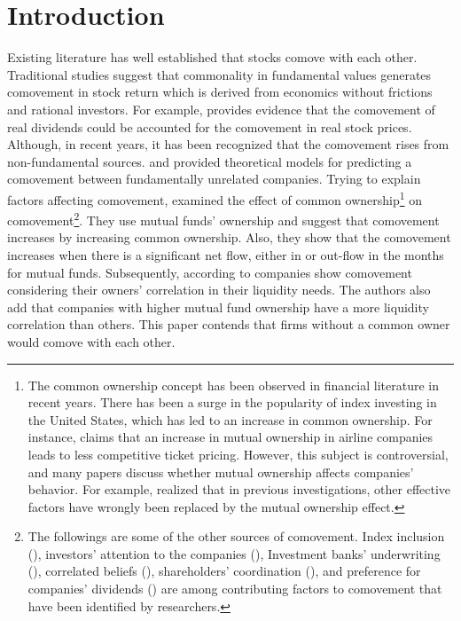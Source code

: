 \section{Introduction}

Existing literature has well established that stocks comove with each other. Traditional studies suggest that commonality in fundamental values generates comovement in stock return which is derived from economics without frictions and rational investors. For example, \cite{shiller1989comovements} provides evidence that the comovement of real dividends could be accounted for the comovement in real stock prices.
	Although, in recent years, it has been recognized that the comovement rises from non-fundamental sources. {\cite{barberis2003style} and \cite{barberis2005comovement}} provided theoretical models for predicting a comovement between fundamentally unrelated companies. Trying to explain factors affecting comovement, {\cite{AntonPolk}} examined the effect of common ownership\footnote{The common ownership concept has been observed in financial literature in recent years. There has been a surge in the popularity of index investing in the United States, which has led to an increase in common ownership. 
			For instance, \cite{azar2018anticompetitive} claims that an increase in mutual ownership in airline companies leads to less competitive ticket pricing. However, this subject is controversial, and many papers discuss whether mutual ownership affects companies' behavior.
			For example, \cite{lewellen2021does} realized that in previous investigations, other effective factors have wrongly been replaced by the mutual ownership effect.
		} on comovement\footnote{	The followings are some of the other sources of comovement. Index inclusion ({\cite{barberis2005comovement}}), investors' attention to the companies ({\cite{wu2014investor}}), Investment banks' underwriting ({\cite{grullon2014comovement}}), correlated beliefs ({\cite{david2016correlated}}), shareholders' coordination ({\cite{pantzalis2017shareholder}}), and preference for companies' dividends ({\cite{HAMEED2019103}}) are among contributing factors to comovement that have been identified by researchers.}. They use mutual funds' ownership and suggest that comovement increases by increasing common ownership. Also, they show that the comovement increases when there is a significant net flow, either in or out-flow in the months for mutual funds.
Subsequently, according to {\cite{Liquidity2016}} companies show comovement considering their owners' correlation in their liquidity needs. The authors also add that companies with higher mutual fund ownership have a more liquidity correlation than others. This paper contends that firms without a common owner would comove with each other. 
	
